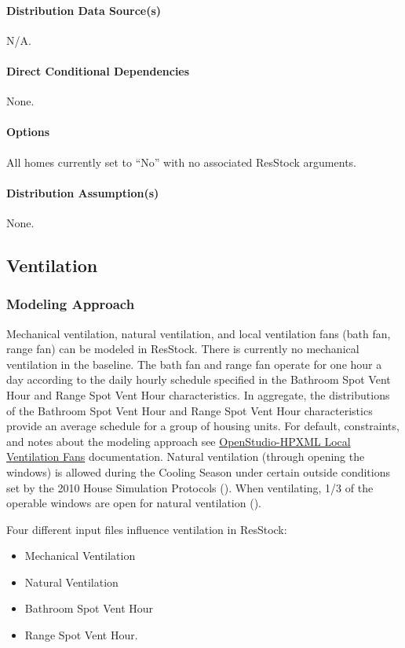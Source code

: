 \paragraph{Distribution Data Source(s)}
N/A.
\paragraph{Direct Conditional Dependencies}
None.
\paragraph{Options}
All homes currently set to ``No'' with no associated ResStock arguments.
\paragraph{Distribution Assumption(s)}
None.

\subsection{Ventilation}
\subsubsection{Modeling Approach}
Mechanical ventilation, natural ventilation, and local ventilation fans (bath fan, range fan) can be modeled in ResStock. There is currently no mechanical ventilation in the baseline.  The bath fan and range fan operate for one hour a day according to the daily hourly schedule specified in the Bathroom Spot Vent Hour and Range Spot Vent Hour characteristics. In aggregate, the distributions of the Bathroom Spot Vent Hour and Range Spot Vent Hour characteristics provide an average schedule for a group of housing units. For default, constraints, and notes about the modeling approach see \href{https://openstudio-hpxml.readthedocs.io/en/v1.8.1/workflow_inputs.html#hpxml-local-ventilation-fans}{OpenStudio-HPXML Local Ventilation Fans} documentation. Natural ventilation (through opening the windows) is allowed during the Cooling Season under certain outside conditions set by the 2010 House Simulation Protocols (\cite{bahsp_2010}). When ventilating, 1/3 of the operable windows are open for natural ventilation (\cite{bahsp_2010}). 

Four different input files influence ventilation in ResStock:
\begin{itemize}
    \item Mechanical Ventilation
    \item Natural Ventilation
    \item Bathroom Spot Vent Hour
    \item Range Spot Vent Hour.
\end{itemize}

